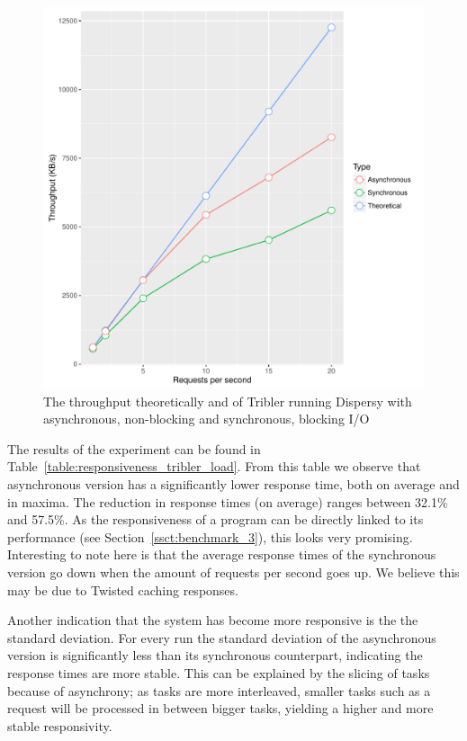\begin{figure}[!h]
	\centering
	\includegraphics[width=\linewidth]{experimentation/images/throughput_requests.pdf}
	\caption{The throughput theoretically and of Tribler running Dispersy with asynchronous, non-blocking and synchronous, blocking I/O }
	\label{fig:throughput_requests}
\end{figure} 

The results of the experiment can be found in Table~\ref{table:responsiveness_tribler_load}.
From this table we observe that asynchronous version has a significantly lower response time, both on average and in maxima.
The reduction in response times (on average) ranges between 32.1\% and 57.5\%.
As the responsiveness of a program can be directly linked to its performance (see Section~\ref{ssct:benchmark_3}), this looks very promising.
Interesting to note here is that the average response times of the synchronous version go down when the amount of requests per second goes up.
We believe this may be due to Twisted caching responses.

Another indication that the system has become more responsive is the the standard deviation.
For every run the standard deviation of the asynchronous version is significantly less than its synchronous counterpart, indicating the response times are more stable. 
This can be explained by the slicing of tasks because of asynchrony; as tasks are more interleaved, smaller tasks such as a request will be processed in between bigger tasks, yielding a higher and more stable responsivity.

